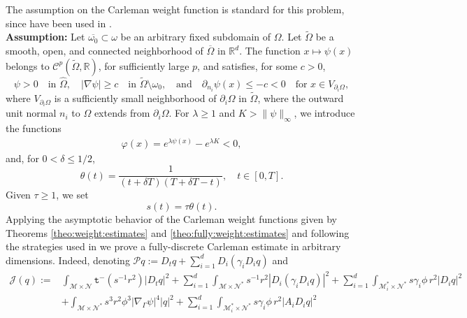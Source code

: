\documentclass[11pt,oneside,leqno]{amsart}
\numberwithin{equation}{section}
\numberwithin{equation}{section}
\newcommand{\trm}{\mathtt t^-}
\begin{document}
\par The assumption on the Carleman weight function is standard for this problem, since have been used in \cite{boyer-2014,LPP:2026,LLRP:2025,BHLR:2010,LPP:2026b}.\\ \textbf{Assumption:} Let $\overline{\omega_0}\subset \omega$ be an arbitrary fixed subdomain of $\Omega$. Let $\tilde{\Omega}$ be a smooth, open, and connected neighborhood of $\overline{\Omega}$ in $\mathbb{R}^d$. The function $x \mapsto \psi(x)$ belongs to $\mathcal{C}^p(\tilde{\Omega}, \mathbb{R})$, for sufficiently large $p$, and satisfies, for some $c > 0$,
\begin{equation}\label{assumtion:psi}
\psi > 0 \quad \text{in } \widehat{\Omega}, \quad |\nabla \psi| \geq c \quad \text{in } \tilde{\Omega} \setminus \omega_0, \quad \text{and} \quad \partial_{n_i} \psi(x) \leq -c < 0 \quad \text{for } x \in V_{\partial_i \Omega},
\end{equation}
where $V_{\partial_i \Omega}$ is a sufficiently small neighborhood of $\partial_i \Omega$ in $\tilde{\Omega}$, where the outward unit normal $n_i$ to $\Omega$  extends from $\partial_i \Omega$. 
For $\lambda\geq 1$ and $K>\|\psi\|_{\infty}$, we introduce the functions
\begin{align}\label{funcion-peso-2}
\varphi(x)=e^{\lambda\psi(x)}-e^{\lambda K}<0,
\end{align}
 and, for $0<\delta \leq 1/2$,
\begin{equation}
    \theta(t)=\frac{1}{(t+\delta T)(T+\delta T-t)},\quad t\in [0,T].
\end{equation}
Given $\tau\geq 1$, we set
\begin{equation}\label{eq1}
s(t)=\tau\theta(t).
\end{equation}
Applying the asymptotic behavior of the Carleman weight functions given by Theorems \ref{theo:weight:estimates} and \ref{theo:fully:weight:estimates} and following the strategies used in \cite{boyer-2014,BHS:2020,GC-HS-2021,LMPZ:2023,LLRP:2025} we prove a fully-discrete Carleman estimate in arbitrary dimensions. Indeed, denoting  $\mathcal{P}q:=D_{t}q+\sum_{i=1}^{d}D_{i}(\gamma_{i}D_{i}q)$ and 
\begin{equation*}
\begin{aligned}
\mathcal{J}(q):=&\int_{\mathcal{M}\times\mathcal{N}}\trm(s^{-1}r^{2})|D_{t}q|^{2}+\sum_{i=1}^{d}\int_{\mathcal{M}\times\mathcal{N}^{\ast}}s^{-1}r^{2}|D_{i}(\gamma_{i}D_{i}q)|^{2}+\sum_{i=1}^{d}\int_{\mathcal{M}_{i}^{\ast}\times\mathcal{N}^{\ast}}s\gamma_{i}\phi\,r^{2}|D_{i}q|^{2}\\
&+\int_{\mathcal{M}\times\mathcal{N}^{\ast}}s^{3}r^{2}\phi^{3}|\nabla_{\Gamma}\psi|^{4}|q|^{2}+\sum_{i=1}^{d}\int_{\mathcal{M}_{i}^{\ast}\times\mathcal{N}^{\ast}}s\gamma_{i}\phi\,r^{2}|A_{i}D_{i}q|^{2}
\end{aligned}
\end{equation*}
\end{document}
